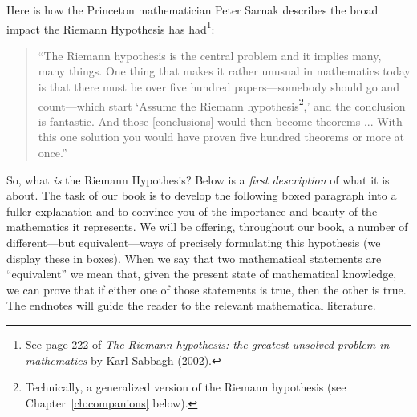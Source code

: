 \documentclass[openany]{book}
\theoremstyle{plain}
\theoremstyle{definition}
\begin{document}
Here is how the
Princeton mathematician Peter Sarnak describes the broad impact the
Riemann Hypothesis has had\footnote{See page 222 of
{\em The Riemann hypothesis: the greatest unsolved problem in mathematics} by Karl Sabbagh (2002).}:
\begin{quote}
``The Riemann hypothesis is the central problem and it implies many,
many things. One thing that makes it rather unusual in mathematics
today is that there must be over five hundred papers---somebody should
go and count---which start `Assume the Riemann hypothesis\footnote{Technically,
a generalized version of the Riemann hypothesis (see
Chapter~\ref{ch:companions} below).},' and
the conclusion is fantastic. And those [conclusions] would then become
theorems ... With this one solution you would have proven five hundred
theorems or more at once.''
\end{quote}



So, what {\it is} the Riemann Hypothesis?  Below is a {\it first
  description} of what it is about. The task of our book is to develop
the following boxed paragraph into a fuller explanation and to
convince you of the importance and beauty of the mathematics it
represents.  We will be offering, throughout our book, a number of
different---but equivalent---ways of precisely formulating this
hypothesis (we display these in boxes).  When we say that two
mathematical statements are ``equivalent'' we mean that, given the
present state of mathematical knowledge, we can prove that if either
one of those statements is true, then the other is true. The endnotes
will guide the reader to the relevant mathematical literature.
\end{document}
